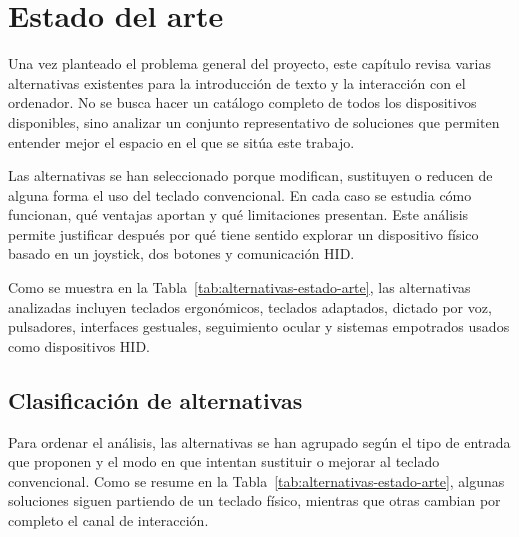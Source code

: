 \chapter{Estado del arte}
\label{sec:estado-arte-introduccion}

Una vez planteado el problema general del proyecto, este capítulo revisa varias alternativas existentes para la introducción de texto y la interacción con el ordenador. No se busca hacer un catálogo completo de todos los dispositivos disponibles, sino analizar un conjunto representativo de soluciones que permiten entender mejor el espacio en el que se sitúa este trabajo.

Las alternativas se han seleccionado porque modifican, sustituyen o reducen de alguna forma el uso del teclado convencional. En cada caso se estudia cómo funcionan, qué ventajas aportan y qué limitaciones presentan. Este análisis permite justificar después por qué tiene sentido explorar un dispositivo físico basado en un joystick, dos botones y comunicación HID.

Como se muestra en la Tabla~\ref{tab:alternativas-estado-arte}, las alternativas analizadas incluyen teclados ergonómicos, teclados adaptados, dictado por voz, pulsadores, interfaces gestuales, seguimiento ocular y sistemas empotrados usados como dispositivos HID.


\section{Clasificación de alternativas}
\label{sec:clasificacion-alternativas}

Para ordenar el análisis, las alternativas se han agrupado según el tipo de entrada que proponen y el modo en que intentan sustituir o mejorar al teclado convencional. Como se resume en la Tabla~\ref{tab:alternativas-estado-arte}, algunas soluciones siguen partiendo de un teclado físico, mientras que otras cambian por completo el canal de interacción.

